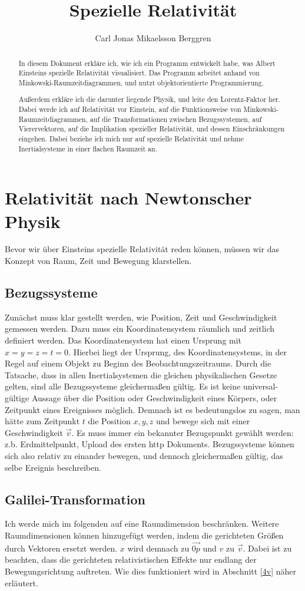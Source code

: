 \documentclass[12pt]{article}
\author{{\Huge Carl Jonas Mikaelsson Berggren}}
\title{{\myfont Spezielle Relativität}}
\begin{document}
\maketitle
\tableofcontents
\newpage
\begin{abstract}
In diesem Dokument erkläre ich, wie ich ein Programm entwickelt habe, was Albert Einsteins spezielle Relativität visualisiert.
Das Programm arbeitet anhand von Minkowski-Raumzeitdiagrammen, und nutzt objektorientierte Programmierung.

Außerdem erkläre ich die darunter liegende Physik, und leite den Lorentz-Faktor her.
Dabei werde ich auf Relativität vor Einstein, auf die Funktionsweise von Minkowski-Raumzeitdiagrammen, auf die Transformationen zwischen Bezugssystemen, auf Vierervektoren, auf die Implikation spezieller Relativität, und dessen Einschränkungen eingehen.
Dabei beziehe ich mich nur auf spezielle Relativität und nehme Inertialsysteme in einer flachen Raumzeit an.
\end{abstract}
\section{Relativität nach Newtonscher Physik}
Bevor wir über Einsteins spezielle Relativität reden können, müssen wir das Konzept von Raum, Zeit und Bewegung klarstellen.
\subsection{Bezugssysteme}
Zunächst muss klar gestellt werden, wie Position, Zeit und Geschwindigkeit gemessen werden.
Dazu muss ein Koordinatensystem räumlich und zeitlich definiert werden.
Das Koordinatensystem hat einen Ursprung  mit $x = y = z = t = 0$.
Hierbei liegt der Ursprung, des Koordinatensystems, in der Regel auf einem Objekt zu Beginn des Beobachtungszeitraums.
Durch die Tatsache, dass in allen Inertialsystemen die gleichen physikalischen Gesetze gelten, sind alle Bezugssysteme gleichermaßen gültig.
Es ist keine universal-gültige Aussage über die Position oder Geschwindigkeit eines Körpers, oder Zeitpunkt eines Ereignisses möglich.
Demnach ist es bedeutungslos zu sagen, man hätte zum Zeitpunkt $t$ die Position $x, y, z$ und bewege sich mit einer Geschwindigkeit $\vec{v}$.
Es muss immer ein bekannter Bezugspunkt gewählt werden: z.b. Erdmittelpunkt, Upload des ersten http Dokuments.
Bezugssysteme können sich also relativ zu einander bewegen, und dennoch gleichermaßen gültig, das selbe Ereignis beschreiben.
\subsection{Galilei-Transformation}
Ich werde mich im folgenden auf eine Raumdimension beschränken.
Weitere Raumdimensionen können hinzugefügt werden, indem die gerichteten Größen durch Vektoren ersetzt werden.
$x$ wird demnach zu $\vec{0p}$ und $v$ zu $\vec{v}$.
Dabei ist zu beachten, dass die gerichteten relativistischen Effekte nur endlang der Bewegungsrichtung auftreten.
Wie dies funktioniert wird in Abschnitt \ref{4v} näher erläutert.
\end{document}
